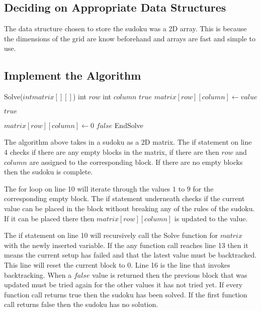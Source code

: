 \documentclass{article}
\begin{document}
\subsection{Deciding on Appropriate Data Structures}
The data structure chosen to store the sudoku was a 2D array. This is because the dimensions of the grid are know beforehand and arrays are fast and simple to use.

\subsection{Implement the Algorithm}

    \begin{algorithmic}[1]
    
    \STATE Solve($int matrix[][]$)
        \STATE int $row$
        \STATE int $column$
\newline
            \RETURN $true$
        \ENDIF
\newline
                \STATE $matrix[row][column]\gets value$
            
                    \RETURN $true$
                \ENDIF
                
                \STATE $matrix[row][column]\gets 0$
            \ENDIF
        \ENDFOR
\newline
        \RETURN $false$
    \STATE EndSolve
\newline
    \end{algorithmic}

The algorithm above takes in a sudoku as a 2D matrix. The if statement on line 4 checks if there are any empty blocks in the matrix, if there are then $row$ and $column$ are assigned to the corresponding block. If there are no empty blocks then the sudoku is complete. 

The for loop on line 10 will iterate through the values $1$ to $9$ for the corresponding empty block. The if statement underneath checks if the current value can be placed in the block without breaking any of the rules of the sudoku. If it can be placed there then $matrix[row][column]$ is updated to the value.

The if statement on line 10 will recursively call the Solve function for $matrix$ with the newly inserted variable.
If the any function call reaches line 13 then it means the current setup has failed and that the latest value must be backtracked. This line will reset the current block to 0. Line 16 is the line that invokes backtracking. When a $false$ value is returned then the previous block that was updated must be tried again for the other values it has not tried yet. If every function call returns true then the sudoku has been solved. If the first function call returns false then the sudoku has no solution.
\end{document}
